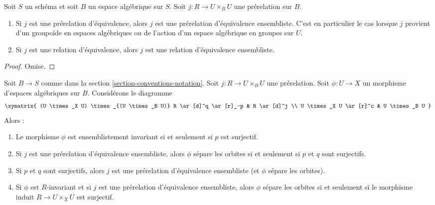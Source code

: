 \begin{lemma}
\label{lemma-set-theoretic-equivalence}
Soit $S$ un schéma et soit $B$ un espace algébrique sur $S$.
Soit $j : R \to U \times_B U$ une prérelation sur $B$.
\begin{enumerate}
\item Si $j$ est une prérelation d'équivalence, alors $j$ est une
prérelation d'équivalence ensembliste. C'est en particulier le cas
lorsque $j$ provient d'un groupoïde en espaces algébriques ou de
l'action d'un espace algébrique en groupes sur $U$.
\item Si $j$ est une relation d'équivalence, alors $j$ est une
relation d'équivalence ensembliste.
\end{enumerate}
\end{lemma}

\begin{proof}
Omise.
\end{proof}

\begin{lemma}
\label{lemma-separates-orbits}
Soit $B \to S$ comme dans la section \ref{section-conventions-notation}.
Soit $j : R \to U \times_B U$ une prérelation.
Soit $\phi : U \to X$ un morphisme d'espaces algébriques sur $B$.
Considérons le diagramme
$$
\xymatrix{
(U \times_X U) \times_{(U \times_B U)} R \ar[d]^q \ar[r]_-p & R \ar[d]^j \\
U \times_X U \ar[r]^c & U \times_B U
}
$$
Alors :
\begin{enumerate}
\item Le morphisme $\phi$ est ensemblistement invariant si et seulement
si $p$ est surjectif.
\item Si $j$ est une prérelation d'équivalence ensembliste, alors
$\phi$ sépare les orbites si et seulement si $p$ et $q$ sont surjectifs.
\item Si $p$ et $q$ sont surjectifs, alors $j$ est une prérelation
d'équivalence ensembliste (et $\phi$ sépare les orbites).
\item Si $\phi$ est $R$-invariant et si $j$ est une prérelation d'équivalence
ensembliste, alors $\phi$ sépare les orbites si et seulement si le morphisme induit
$R \to U \times_X U$ est surjectif.
\end{enumerate}
\end{lemma}


